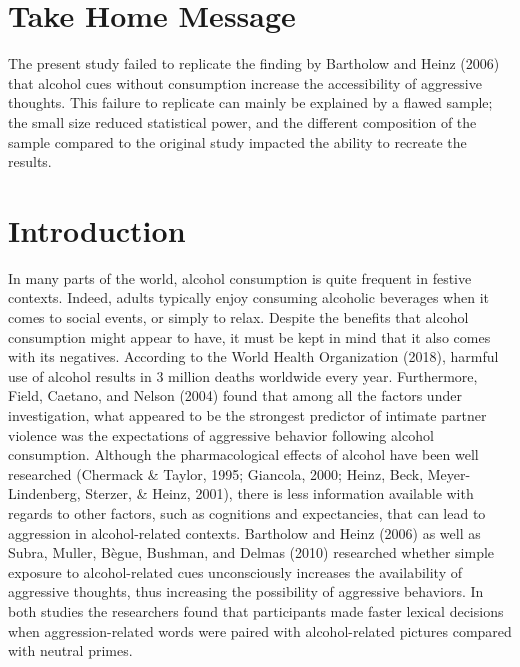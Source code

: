 \documentclass[authordate, serif, review]{jote-article}
\begin{document}
\begin{multicols}{2}
{}
\section*{Take Home Message} \gotoreview
\label{sec:take-home}

\noindent The present study failed to replicate the finding by Bartholow and Heinz (2006) that alcohol cues without consumption increase the accessibility of aggressive thoughts. This failure to replicate can mainly be explained by a flawed sample; the small size reduced statistical power, and the different composition of the sample compared to the original study impacted the ability to recreate the results.  

{}
\section*{Introduction} \gotoreview
\label{sec:introduction}

\noindent In many parts of the world, alcohol consumption is quite frequent in festive contexts. Indeed, adults typically enjoy consuming alcoholic beverages when it comes to social events, or simply to relax. Despite the benefits that alcohol consumption might appear to have, it must be kept in mind that it also comes with its negatives. According to the World Health Organization (2018), harmful use of alcohol results in 3 million deaths worldwide every year. Furthermore, Field, Caetano, and Nelson (2004) found that among all the factors under investigation, what appeared to be the strongest predictor of intimate partner violence was the expectations of aggressive behavior following alcohol consumption. Although the pharmacological effects of alcohol have been well researched (Chermack \& Taylor, 1995; Giancola, 2000; Heinz, Beck, Meyer-Lindenberg, Sterzer, \& Heinz, 2001), there is less information available with regards to other factors, such as cognitions and expectancies, that can lead to aggression in alcohol-related contexts. Bartholow and Heinz (2006) as well as Subra, Muller, Bègue, Bushman, and Delmas (2010) researched whether simple exposure to alcohol-related cues unconsciously increases the availability of aggressive thoughts, thus increasing the possibility of aggressive behaviors. In both studies the researchers found that participants made faster lexical decisions when aggression-related words were paired with alcohol-related pictures compared with neutral primes.  


\end{multicols}
\end{document}
